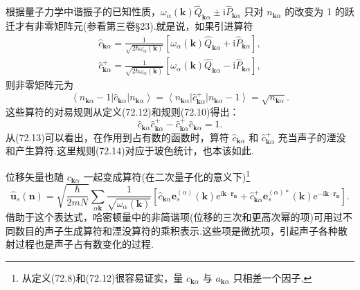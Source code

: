 根据量子力学中谐振子的已知性质，$\omega_\alpha(\boldsymbol{k})\hat{Q}_{\boldsymbol{k}\alpha}\pm\mathrm{i}\hat{P}_{\boldsymbol{k}\alpha}$ 只对 $n_{\boldsymbol{k}\alpha}$ 的改变为 1 的跃迁才有非零矩阵元(参看第三卷§23).就是说，如果引进算符
\begin{equation}
\begin{gathered}
  \hat{c}_{\boldsymbol{k}\alpha}=\frac{1}{\sqrt{2\hbar\omega_\alpha(\boldsymbol{k})}}\left[\omega_\alpha(\boldsymbol{k})\hat{Q}_{\boldsymbol{k}\alpha}+\mathrm{i}\hat{P}_{\boldsymbol{k}\alpha}\right],\\
  \hat{c}^{+}_{\boldsymbol{k}\alpha}=\frac{1}{\sqrt{2\hbar\omega_\alpha(\boldsymbol{k})}}\left[\omega_\alpha(\boldsymbol{k})\hat{Q}_{\boldsymbol{k}\alpha}-\mathrm{i}\hat{P}_{\boldsymbol{k}\alpha}\right],
\end{gathered}
\end{equation}
则非零矩阵元为
\begin{equation}
  \left\langle n_{\boldsymbol{k}\alpha}-1\right|\hat{c}_{\boldsymbol{k}\alpha}\left|n_{\boldsymbol{k}\alpha}\right\rangle
  =\left\langle n_{\boldsymbol{k}\alpha}\right|\hat{c}^{+}_{\boldsymbol{k}\alpha}\left|n_{\boldsymbol{k}\alpha}-1\right\rangle
  =\sqrt{n_{\boldsymbol{k}\alpha}}.
\end{equation}
这些算符的对易规则从定义(72.12)和规则(72.10)得出：
\begin{equation}
  \hat{c}_{\boldsymbol{k}\alpha}\hat{c}^{+}_{\boldsymbol{k}\alpha}-\hat{c}^{+}_{\boldsymbol{k}\alpha}\hat{c}_{\boldsymbol{k}\alpha}=1.
\end{equation}
从(72.13)可以看出，在作用到占有数的函数时，算符 $\hat{c}_{\boldsymbol{k}\alpha}$ 和 $\hat{c}^{+}_{\boldsymbol{k}\alpha}$ 充当声子的湮没和产生算符.这里规则(72.14)对应于玻色统计，也本该如此.

位移矢量也随 $c_{\boldsymbol{k}\alpha}$ 一起变成算符(在二次量子化的意义下)\footnote{从定义(72.8)和(72.12)很容易证实，量 $c_{\boldsymbol{k}\alpha}$ 与 $a_{\boldsymbol{k}\alpha}$ 只相差一个因子.}
\begin{equation}
  \hat{\boldsymbol{u}}_s(\boldsymbol{n})=\sqrt{\frac{\hbar}{2mN}}\sum_{\alpha\boldsymbol{k}}\frac{1}{\sqrt{\omega_\alpha(\boldsymbol{k})}}
  \left[\hat{c}_{\boldsymbol{k}\alpha}\boldsymbol{e}_s^{(\alpha)}(\boldsymbol{k})\mathrm{e}^{\mathrm{i}\boldsymbol{k}\cdot\boldsymbol{r}_{\boldsymbol{n}}}
  +\hat{c}^{+}_{\boldsymbol{k}\alpha}\boldsymbol{e}_s^{(\alpha)*}(\boldsymbol{k})\mathrm{e}^{-\mathrm{i}\boldsymbol{k}\cdot\boldsymbol{r}_{\boldsymbol{n}}}\right].
\end{equation}
借助于这个表达式，哈密顿量中的非简谐项(位移的三次和更高次幂的项)可用过不同数目的声子生成算符和湮没算符的乘积表示.这些项是微扰项，引起声子各种散射过程也是声子占有数变化的过程.

